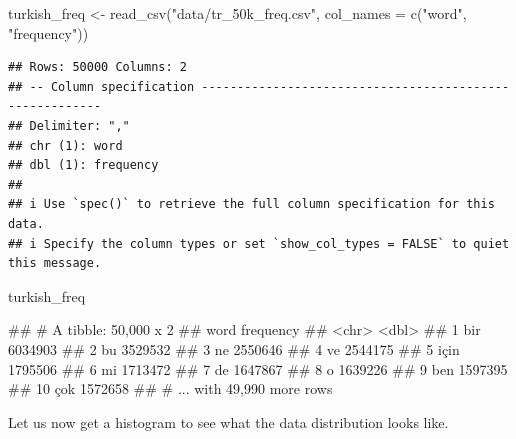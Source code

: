 \documentclass[
]{book}
\newenvironment{Shaded}{\begin{snugshade}}{\end{snugshade}}
\newcommand{\AttributeTok}[1]{\textcolor[rgb]{0.77,0.63,0.00}{#1}}
\newcommand{\FunctionTok}[1]{\textcolor[rgb]{0.00,0.00,0.00}{#1}}
\newcommand{\NormalTok}[1]{#1}
\newcommand{\OtherTok}[1]{\textcolor[rgb]{0.56,0.35,0.01}{#1}}
\newcommand{\StringTok}[1]{\textcolor[rgb]{0.31,0.60,0.02}{#1}}
\begin{document}
\begin{Shaded}
\begin{Highlighting}[]
\NormalTok{turkish\_freq }\OtherTok{\textless{}{-}} \FunctionTok{read\_csv}\NormalTok{(}\StringTok{"data/tr\_50k\_freq.csv"}\NormalTok{, }\AttributeTok{col\_names =} \FunctionTok{c}\NormalTok{(}\StringTok{"word"}\NormalTok{, }\StringTok{"frequency"}\NormalTok{))}
\end{Highlighting}
\end{Shaded}

\begin{verbatim}
## Rows: 50000 Columns: 2
## -- Column specification --------------------------------------------------------
## Delimiter: ","
## chr (1): word
## dbl (1): frequency
## 
## i Use `spec()` to retrieve the full column specification for this data.
## i Specify the column types or set `show_col_types = FALSE` to quiet this message.
\end{verbatim}

\begin{Shaded}
\begin{Highlighting}[]
\NormalTok{turkish\_freq}
\end{Highlighting}
\end{Shaded}

\begin{Shaded}
\begin{Highlighting}[]
\NormalTok{\#\# \# A tibble: 50,000 x 2}
\NormalTok{\#\#    word  frequency}
\NormalTok{\#\#    \textless{}chr\textgreater{}     \textless{}dbl\textgreater{}}
\NormalTok{\#\#  1 bir     6034903}
\NormalTok{\#\#  2 bu      3529532}
\NormalTok{\#\#  3 ne      2550646}
\NormalTok{\#\#  4 ve      2544175}
\NormalTok{\#\#  5 için    1795506}
\NormalTok{\#\#  6 mi      1713472}
\NormalTok{\#\#  7 de      1647867}
\NormalTok{\#\#  8 o       1639226}
\NormalTok{\#\#  9 ben     1597395}
\NormalTok{\#\# 10 çok     1572658}
\NormalTok{\#\# \# ... with 49,990 more rows}
\end{Highlighting}
\end{Shaded}

Let us now get a histogram to see what the data distribution looks like.
\end{document}
